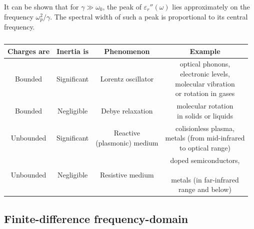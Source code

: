 It can be shown that for $\gamma \gg \omega_0$, the peak of $\varepsilon_r''(\omega)$ lies approximately on the frequency $\omega_p^{2}/\gamma$. The spectral width of such a peak is proportional to its central frequency. 


\begin{table}[ht]   \caption{}  \label{tb_} \centering 
\begin{tabular}{cc|cc}
 \toprule
\textbf{Charges are}	& \textbf{Inertia is}				& \textbf{Phenomenon}				& \textbf{Example}		 \\
 \hline
Bounded		& Significant				& Lorentz oscillator					& \shortstack{optical phonons, \\electronic levels,\\ molecular vibration \\or rotation in gases}	\\
 \hline
Bounded		& Negligible				& Debye relaxation						& \shortstack{molecular rotation \\in solids or liquids} \\
 \hline
Unbounded	& Significant				& \shortstack{Reactive\\(plasmonic) medium}			& \shortstack{colisionless plasma, \\metals (from mid-infrared\\to optical range)} \\
 \hline
Unbounded	& Negligible				& Resistive medium						& \shortstack{doped semiconductors,\\\newline metals (in far-infrared\\ range and below)} \\
 \bottomrule
 \end{tabular} \end{table}




\subsection{Finite-difference frequency-domain} %

